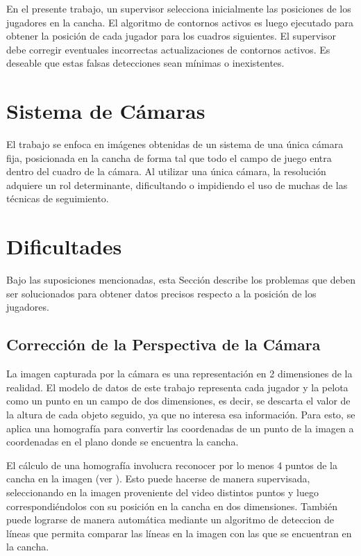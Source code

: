 En el presente trabajo, un supervisor selecciona inicialmente las posiciones
de los jugadores en la cancha. El algoritmo de contornos activos es luego
ejecutado para obtener la posición de cada jugador para los cuadros siguientes.
El supervisor debe corregir eventuales incorrectas actualizaciones de contornos
activos. Es deseable que estas falsas detecciones sean mínimas o inexistentes.

\section{Sistema de Cámaras}

El trabajo se enfoca en imágenes obtenidas de un sistema de una única cámara
fija, posicionada en la cancha de forma tal que todo el campo de juego entra
dentro del cuadro de la cámara. Al utilizar una única cámara, la resolución
adquiere un rol determinante, dificultando o impidiendo el uso de muchas de las
técnicas de seguimiento.

\section{Dificultades}

Bajo las suposiciones mencionadas, esta Sección describe los problemas que
deben ser solucionados para obtener datos precisos respecto a la posición
de los jugadores.

\subsection{Corrección de la Perspectiva de la Cámara}

La imagen capturada por la cámara es una representación en 2 dimensiones de la
realidad. El modelo de datos de este trabajo representa cada jugador y la
pelota como un punto en un campo de dos dimensiones, es decir, se descarta el
valor de la altura de cada objeto seguido, ya que no interesa esa información.
Para esto, se aplica una homografía para convertir las coordenadas de un punto
de la imagen a coordenadas en el plano donde se encuentra la cancha.

El cálculo de una homografía involucra reconocer por lo menos 4 puntos de la
cancha en la imagen (ver \cite{homography-estimation}). Esto puede hacerse de
manera supervisada, seleccionando en la imagen proveniente del video distintos
puntos y luego correspondiéndolos con su posición en la cancha en dos
dimensiones. También puede lograrse de manera automática mediante un algoritmo
de deteccion de líneas que permita comparar las líneas en la imagen con las que
se encuentran en la cancha.

